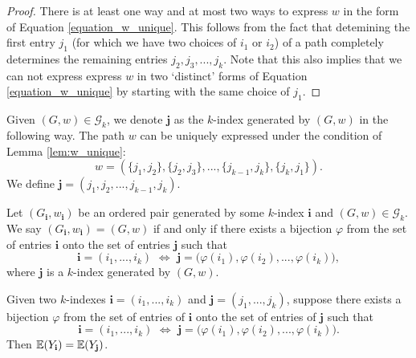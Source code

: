 \begin{proof}
  There is at least one way and at most two ways to express $w$ in the form of Equation \ref{equation_w_unique}.
  This follows from the fact that detemining the first entry $j_1$ (for which we have two choices of $i_1$ or $i_2$) of a path completely determines the remaining entries $j_2,j_3,...,j_k$. 
  Note that this also implies that we can not express express $w$ in two `distinct' forms of Equation \ref{equation_w_unique} by starting with the same choice of $j_1$.
\end{proof}
\begin{definition}
  \label{def:g_k_j}
  Given $(G,w) \in \mathcal{G}_k$, we denote $\mathbf{j}$ as the $k$-index generated by $(G,w)$ in the following way. 
  The path $w$ can be uniquely expressed under the condition of Lemma \ref{lem:w_unique}:
  \[
  w = (\{j_1,j_2\},\{j_2,j_3\},...,\{j_{k-1},j_k\},\{j_k,j_1\}).
  \] 
  We define $\mathbf{j} = (j_1,j_2,...,j_{k-1},j_k)$.
\end{definition}
\begin{definition}[$(G_\mathbf{i},w_\mathbf{i}) = (G,w)$ : R-1-6 : def:g\_k\_equiv]
  \label{def:g_k_equiv}
  Let $(G_\mathbf{i},w_\mathbf{i})$ be an ordered pair generated by some $k$-index $\mathbf{i}$ and $(G,w) \in \mathcal{G}_k$.
  We say $(G_\mathbf{i},w_\mathbf{i}) = (G,w)$ if and only if there exists a bijection $\varphi$ from the set of entries $\mathbf{i}$ onto the set of entries $\mathbf{j}$ such that
  \[
  \mathbf{i} = (i_1,...,i_k) \,\, \Longleftrightarrow \,\, \mathbf{j} = \bigl( \varphi(i_1),\varphi(i_2),...,\varphi(i_k) \bigl),
  \]
  where $\mathbf{j}$ is a $k$-index generated by $(G,w)$.
\end{definition}
\begin{lemma}[$\mathbf{i} \sim \mathbf{j} \Rightarrow \mathbb{E}(Y_\mathbf{i}) = \mathbb{E}(Y_\mathbf{j})$ : R-1-7 : lem:eq\_equiv\_eq\_expect]
  \label{lem:eq_equiv_eq_expect}
  Given two $k$-indexes $\mathbf{i} = (i_1,...,i_k)$ and $\mathbf{j} = (j_1,...,j_k)$, 
  suppose there exists a bijection $\varphi$ from the set of entries of $\mathbf{i}$ onto the set of entries of $\mathbf{j}$ such that
  \[
  \mathbf{i} = (i_1,...,i_k) \,\, \Longleftrightarrow \,\, \mathbf{j} = \bigl( \varphi(i_1),\varphi(i_2),...,\varphi(i_k) \bigl).
  \]
  Then $\mathbb{E} (Y_\mathbf{i}) = \mathbb{E} (Y_{\mathbf{j}})$.
\end{lemma}
